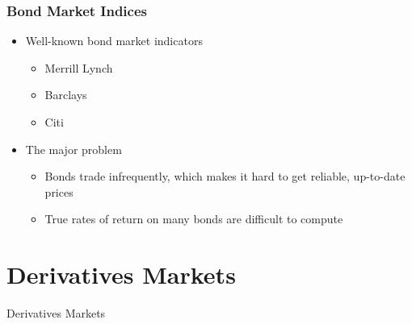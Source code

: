 \documentclass[10pt]{beamer}
\begin{document}
	
	\begin{frame}
		\frametitle{Bond Market Indices}
		
		\begin{itemize} \vspace{5pt} \itemsep10pt
			\item Well-known bond market indicators 
			\begin{itemize} \vspace{5pt} \itemsep10pt
				\item Merrill Lynch
				\item Barclays
				\item Citi 
			\end{itemize}
			\item The major problem
			\begin{itemize} \vspace{5pt} \itemsep10pt
				\item Bonds trade infrequently, which makes it hard to get reliable, up-to-date prices
				\item True rates of return on many bonds are difficult to compute
			\end{itemize}
			
			
		\end{itemize}
		
	\end{frame}
	
	
	
	\section{Derivatives Markets}
	\begin{frame}
		\begin{center}
			{\Large Derivatives Markets}
		\end{center}
	\end{frame}
	
\end{document}
